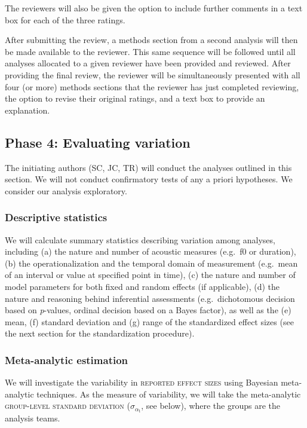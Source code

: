 \documentclass[Review,times,sageh]{sagej}
\begin{document}
The reviewers will also be given the option to include further comments in a text box for each of the three ratings.

After submitting the review, a methods section from a second analysis will then be made available to the reviewer.
This same sequence will be followed until all analyses allocated to a given reviewer have been provided and reviewed.
After providing the final review, the reviewer will be simultaneously presented with all four (or more) methods sections that the reviewer has just completed reviewing, the option to revise their original ratings, and a text box to provide an explanation.

\hypertarget{phase-4-evaluating-variation}{%
\subsection{Phase 4: Evaluating variation}\label{phase-4-evaluating-variation}}

The initiating authors (SC, JC, TR) will conduct the analyses outlined in this section. We will not conduct confirmatory tests of any a priori hypotheses. We consider our analysis exploratory.

\hypertarget{descriptive-statistics}{%
\subsubsection{Descriptive statistics}\label{descriptive-statistics}}

We will calculate summary statistics describing variation among analyses, including (a) the nature and number of acoustic measures (e.g.~f0 or duration), (b) the operationalization and the temporal domain of measurement (e.g.~mean of an interval or value at specified point in time), (c) the nature and number of model parameters for both fixed and random effects (if applicable), (d) the nature and reasoning behind inferential assessments (e.g.~dichotomous decision based on \emph{p}-values, ordinal decision based on a Bayes factor), as well as the (e) mean, (f) standard deviation and (g) range of the standardized effect sizes (see the next section for the standardization procedure).

\hypertarget{s:meta-est}{%
\subsubsection{Meta-analytic estimation}\label{s:meta-est}}

We will investigate the variability in \textsc{reported effect sizes} using Bayesian meta-analytic techniques.
As the measure of variability, we will take the meta-analytic \textsc{group-level standard deviation} (\(\sigma_{\alpha_{\text{t}}}\), see below), where the groups are the analysis teams.
\end{document}
